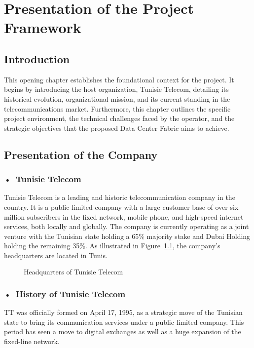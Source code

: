 \chapter{Presentation of the Project Framework}
\section{Introduction}
This opening chapter establishes the foundational context for the project. It begins by introducing the host organization, Tunisie Telecom, detailing its historical evolution, organizational mission, and its current standing in the telecommunications market. Furthermore, this chapter outlines the specific project environment, the technical challenges faced by the operator, and the strategic objectives that the proposed Data Center Fabric aims to achieve.

\section{Presentation of the Company}

\subsection*{\mbox{•}~Tunisie Telecom}
Tunisie Telecom \cite{Tunisie_Telecom} is a leading and historic telecommunication company in the country. It is a public limited company with a large customer base of over six million subscribers in the fixed network, mobile phone, and high-speed internet services, both locally and globally. The company is currently operating as a joint venture with the Tunisian state holding a 65\% majority stake and Dubai Holding \cite{Dubai_Holding_site} holding the remaining 35\%. As illustrated in Figure~\ref{fig:headquarters}, the company's headquarters are located in Tunis.

\begin{figure}[htbp]
    \centering
    \Telecom
    \caption{Headquarters of Tunisie Telecom \cite{Tunisie_Telecom}}
    \label{fig:headquarters}
\end{figure}


\subsection*{\mbox{•}~History of Tunisie Telecom}
TT\cite{Tunisie_Telecom} was officially formed on April 17, 1995, as a strategic move of the Tunisian state to bring its communication services under a public limited company. This period has seen a move to digital exchanges as well as a huge expansion of the fixed-line network.


